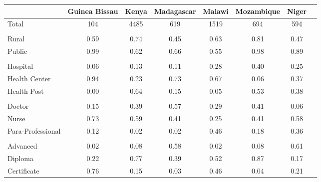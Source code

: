 \def\sym#1{\ifmmode^{#1}\else\(^{#1}\)\fi}
\begin{tabular}{l*{7}{c}}
\hline\hline
&\multicolumn{1}{c}{Guinea Bissau}&\multicolumn{1}{c}{Kenya}&\multicolumn{1}{c}{Madagascar}&\multicolumn{1}{c}{Malawi}&\multicolumn{1}{c}{Mozambique}&\multicolumn{1}{c}{Niger}&\\
\hline
Total&                                         {104}&        {4485}&  {619}&      {1519}&        {694}&        {594}\\
  &  {}\\
Rural&                                         {0.59}&        {0.74}&  {0.45}&  {0.63}&    {0.81}&        {0.47}\\
Public&                                        {0.99}&        {0.62}&  {0.66}&  {0.55}&    {0.98}&        {0.89}\\
 &   {}\\
Hospital&                              {0.06}&        {0.13}&  {0.11}&  {0.28}&    {0.40}&        {0.25}\\
Health Center&                         {0.94}&        {0.23}&  {0.73}&      {0.67}&        {0.06}&        {0.37}\\
Health Post&                           {0.00}&        {0.64}&  {0.15}&  {0.05}&    {0.53}&        {0.38}\\
 &   {}\\
Doctor&                                        {0.15}&        {0.39}&  {0.57}&  {0.29}&    {0.41}&        {0.06}\\
Nurse&                                         {0.73}&        {0.59}&  {0.41}&  {0.25}&    {0.41}&        {0.58}\\
Para-Professional&             {0.12}&        {0.02}&  {0.02}&  {0.46}&    {0.18}&        {0.36}\\
&   {}\\
Advanced&                              {0.02}&        {0.08}&  {0.58}&  {0.02}&    {0.08}&        {0.61}\\
Diploma&                                       {0.22}&        {0.77}&  {0.39}&  {0.52}&    {0.87}&        {0.17}\\
Certificate&                           {0.76}&        {0.15}&  {0.03}&  {0.46}&    {0.04}&        {0.21}\\
\hline
\end{tabular}